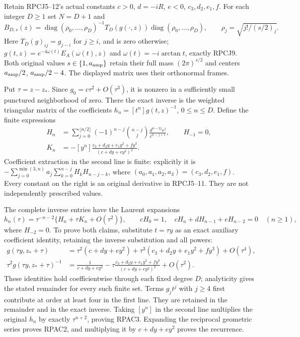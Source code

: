 \documentclass[11pt]{article}
\begin{document}
Retain RPCJ5--12's actual constants $c>0$, $d=-iR$, $e<0$,
$c_3,d_2,e_1,f$. For each integer $D\ge1$ set $N=D+1$ and
\[
 B_{D,s}(z)=\operatorname{diag}(\rho_0,\ldots,\rho_D)^{-1}
          T_D(g(\cdot,z))\operatorname{diag}(\rho_0,\ldots,\rho_D),
 \qquad \rho_j=\sqrt{j!/(s/2)_j}.
 \tag{RPAC1}
\]
Here $T_D(g)_{ij}=g_{j-i}$ for $j\ge i$, and is zero otherwise;
$g(t,z)=e^{-4\omega(t)}E_A(\omega(t),z)$ and
$\omega(t)=-i\arctan t$, exactly RPCJ9. Both original values
$s\in\{1,a_{\rm amp}\}$ retain their full mass
$(2\pi)^{s/2}$ and centers $a_{\rm amp}/2$, $a_{\rm amp}/2-4$.
The displayed matrix uses their orthonormal frames.

Put $\tau=z-z_*$. Since $g_0=c\tau^2+O(\tau^3)$, it is
nonzero in a sufficiently small punctured neighborhood of zero.
There the exact inverse is the weighted triangular matrix of the
coefficients $h_n=[t^n]g(t,z)^{-1}$, $0\le n\le D$.
Define the finite expressions
\[
 \begin{aligned}
 H_n&=\sum_{j=0}^{\lfloor n/2\rfloor}
    (-1)^{n-j}\binom{n-j}{j}
           \frac{d^{n-2j}e^j}{c^{n-j+1}},\qquad H_{-1}=0,\\
 K_n&=-[y^n]\frac{c_3+d_2y+e_1y^2+fy^3}{(c+dy+ey^2)^2}.
 \end{aligned}\tag{RPAC2}
\]
Coefficient extraction in the second line is finite: explicitly it is
$-\sum_{j=0}^{\min(3,n)}a_j\sum_{k=0}^{n-j}H_kH_{n-j-k}$,
where $(a_0,a_1,a_2,a_3)=(c_3,d_2,e_1,f)$.
Every constant on the right is an original derivative in RPCJ5--11.
They are not independently prescribed values.

The complete inverse entries have the Laurent expansions
\[
 h_n(\tau)=\tau^{-n-2}\{H_n+\tau K_n+O(\tau^2)\},\qquad
 cH_0=1,\quad cH_n+dH_{n-1}+eH_{n-2}=0\quad(n\ge1),
 \tag{RPAC3}
\]
where $H_{-2}=0$. To prove both claims, substitute $t=\tau y$
as an exact auxiliary coefficient identity, retaining the inverse
substitution and all powers:
\[
 \begin{aligned}
 g(\tau y,z_*+\tau)
 &=\tau^2(c+dy+ey^2)
   +\tau^3(c_3+d_2y+e_1y^2+fy^3)+O(\tau^4),\\
 \tau^2g(\tau y,z_*+\tau)^{-1}
 &=\frac1{c+dy+ey^2}
 -\tau\frac{c_3+d_2y+e_1y^2+fy^3}{(c+dy+ey^2)^2}
 +O(\tau^2).
 \end{aligned}\tag{RPAC4}
\]
These identities hold coefficientwise through each fixed degree $D$;
analyticity gives the stated remainder for every such finite set.
Terms $g_jt^j$ with $j\ge4$ first contribute at order at least four
in the first line. They are retained in the remainder and in the
exact inverse. Taking $[y^n]$ in the second line multiplies the
original $h_n$ by exactly $\tau^{n+2}$, proving RPAC3.
Expanding the reciprocal geometric series proves RPAC2, and
multiplying it by $c+dy+ey^2$ proves the recurrence.
\end{document}
